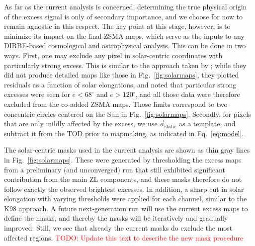 \documentclass{aa}
\renewcommand{\a}[0]{\vec{a}}
\begin{document}
As far as the current analysis is concerned, determining the true
physical origin of the excess signal is only of secondary importance,
and we choose for now to remain agnostic in this respect. The key
point at this stage, however, is to minimize its impact on the final
ZSMA maps, which serve as the inputs to any DIRBE-based cosmological
and astrophysical analysis. This can be done in two ways. First, one
may exclude any pixel in solar-centric coordinates with particularly
strong excess. This is similar to the approach taken by
\citet{kelsall1998}; while they did not produce detailed maps like
those in Fig.~\ref{fig:solarmaps}, they plotted residuals as a
function of solar elongations, and noted that particular strong
excesses were seen for $e<68^{\circ}$ and $e>120^{\circ}$, and all
those data were therefore excluded from the co-added ZSMA maps. Those
limits correspond to two concentric circles centered on the Sun in
Fig.~\ref{fig:solarmaps}. Secondly, for pixels that are only mildly
affected by the excess, we use $\a_{\mathrm{static}}$ as a template, and
subtract it from the TOD prior to mapmaking, as indicated in
Eq.~\eqref{eq:model}. 


The solar-centric masks used in the current analysis are shown as thin
gray lines in Fig.~\ref{fig:solarmaps}. These were generated by
thresholding the excess maps from a preliminary (and unconverged) run
that still exhibited significant contribution from the main ZL
components, and these masks therefore do not follow exactly the
observed brightest excesses. In addition, a sharp cut in solar
elongation with varying thresholds were applied for each channel,
similar to the K98 approach. A future next-generation run will use the
current excess maps to define the masks, and thereby the masks will be
iteratively and gradually improved. Still, we see that already the
current masks do exclude the most affected regions. \textcolor{red}{TODO: Update this text to describe the new mask procedure}
\end{document}

